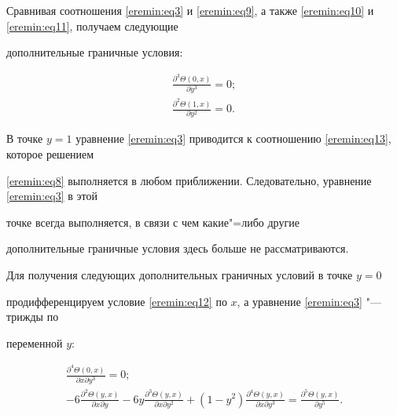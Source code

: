 Сравнивая соотношения \eqref{eremin:eq3} и \eqref{eremin:eq9}, а также \eqref{eremin:eq10} и \eqref{eremin:eq11}, получаем следующие

дополнительные граничные условия:

\begin{gather}

\label{eremin:eq12}

\frac{\partial ^3\Theta (0,  x)}{\partial

y^3}=0;\\

\label{eremin:eq13}

\frac{\partial^2\Theta

(1, x)}{\partial y^2}=0.

\end{gather}



В точке $y=1$ уравнение \eqref{eremin:eq3} приводится к соотношению \eqref{eremin:eq13}, которое решением

\eqref{eremin:eq8} выполняется в любом приближении. Следовательно, уравнение \eqref{eremin:eq3} в этой

точке всегда выполняется, в связи с чем какие"=либо другие

дополнительные граничные условия здесь больше не рассматриваются.



Для получения следующих дополнительных граничных условий в точке $y=0$

продифференцируем условие \eqref{eremin:eq12} по $x$, а уравнение \eqref{eremin:eq3} "--- трижды по

переменной $y$:

\begin{gather}

\label{eremin:eq14}

\frac{\partial ^4\Theta (0,  x)}{\partial x\partial y^3}=0;\\

\label{eremin:eq15}

-6\frac{\partial ^2\Theta (y,x)}{\partial x\partial y}-6y\frac{\partial

^3\Theta (y,x)}{\partial x\partial y^2}+(1-y^2)\frac{\partial^4\Theta

(y,x)}{\partial x\partial y^3}=\frac{\partial ^5\Theta (y,x)}{\partial

y^5}.

\end{gather}



